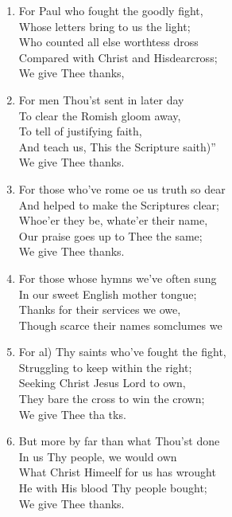 \documentclass[11pt,a4paper]{article}
\begin{document}
\begin{enumerate}
    \item For Paul who fought the goodly fight, \\
        Whose letters bring to us the light; \\
        Who counted all else worthtess dross \\
        Compared with Christ and Hisdearcross; \\
        We give Thee thanks,

    \item For men Thou'st sent in later day \\
        To clear the Romish gloom away, \\
        To tell of justifying faith, \\
        And teach us, This the Scripture saith)'' \\
        We give Thee thanks.

    \item For those who've rome oe us truth so dear \\
        And helped to make the Scriptures clear; \\
        Whoe'er they be, whate'er their name, \\
        Our praise goes up to Thee the same; \\
        We give Thee thanks.

    \item For those whose hymns we've often sung \\
        In our sweet English mother tongue; \\
        Thanks for their services we owe, \\
        Though scarce their names somclumes we

    \item For al) Thy saints who've fought the fight, \\
        Struggling to keep within the right; \\
        Seeking Christ Jesus Lord to own, \\
        They bare the cross to win the crown; \\
        We give Thee tha tks.

    \item But more by far than what Thou'st done \\
        In us Thy people, we would own \\
        What Christ Himeelf for us has wrought \\
        He with His blood Thy people bought; \\
        We give Thee thanks.


\end{enumerate}
\end{document}
